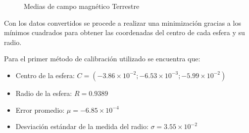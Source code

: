 \documentclass[spanish,12pt,a4paper,titlepage]{report}
\begin{document}
\begin{figure}
  \begin{center}
  \end{center}
  \caption{Medias de campo magnético Terrestre}
\end{figure}


Con los datos convertidos se procede a realizar una minimización gracias a los mínimos cuadrados para obtener las coordenadas del centro de cada esfera y su radio.

Para el primer método de calibración utilizado se encuentra que:
\begin{itemize}
\item Centro de la esfera: $C=(-3.86\times10^{-2};-6.53\times10^{-3};-5.99\times10^{-2})$
\item Radio de la esfera: $R=0.9389$
\item Error promedio: $\mu = -6.85\times10^{-4}$
\item Desviación estándar de la medida del radio: $\sigma = 3.55\times10^{-2}$
\end{itemize}
\end{document}
